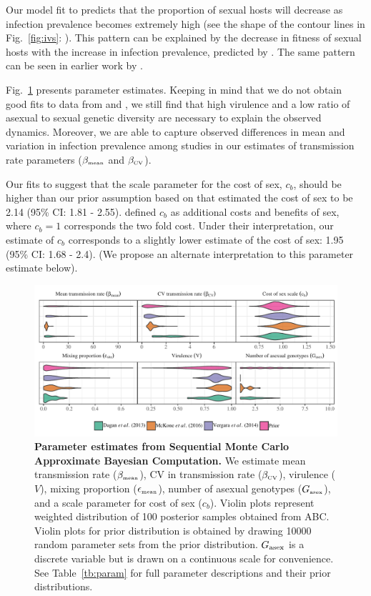 \documentclass{article}\usepackage[]{graphicx}\usepackage[]{color}
\newcommand{\fref}[1]{Fig.~\ref{fig:#1}}
\begin{document}
Our model fit to \cite{vergara2014infection} predicts that the proportion of sexual hosts will decrease as infection prevalence becomes extremely high (see the shape of the contour lines in \fref{ivs}: \cite{vergara2014infection}).
This pattern can be explained by the decrease in fitness of sexual hosts with the increase in infection prevalence, predicted by \cite{ashby2015diversity}.
The same pattern can be seen in earlier work by \cite{lively2010epidemiological}.

\fref{smcparam} presents parameter estimates.
Keeping in mind that we do not obtain good fits to data from \cite{dagan2013clonal} and \cite{mckone2016fine}, we still find that high virulence and a low ratio of asexual to sexual genetic diversity are necessary to explain the observed dynamics.
Moreover, we are able to capture observed differences in mean and variation in infection prevalence among studies in our estimates of transmission rate parameters ($\beta_{\textrm{\tiny mean}}$ and $\beta_{\textrm{\tiny CV}}$).

Our fits to \cite{mckone2016fine} suggest that the scale parameter for the cost of sex, $c_b$, should be higher than our prior assumption based on \cite{gibson2017two} that estimated the cost of sex to be 2.14 (95\% CI: 1.81 - 2.55).
\cite{ashby2015diversity} defined $c_b$ as additional costs and benefits of sex, where $c_b=1$ corresponds the two fold cost.
Under their interpretation, our estimate of $c_b$ corresponds to a slightly lower estimate of the cost of sex: 1.95 (95\% CI: 1.68 - 2.4). 
(We propose an alternate interpretation to this parameter estimate below).

\begin{figure}[!ht]
\includegraphics[width=\textwidth]{../fig/posterior.pdf}
\caption{{\bf Parameter estimates from Sequential Monte Carlo Approximate Bayesian Computation.}
We estimate mean transmission rate ($\beta_{\textrm{\tiny mean}}$), CV in transmission rate ($\beta_{\textrm{\tiny CV}}$), virulence ($V$), mixing proportion ($\epsilon_{\textrm{\tiny mean}}$), number of asexual genotypes ($G_{\textrm{\tiny asex}}$), and a scale parameter for cost of sex ($c_b$).
Violin plots represent weighted distribution of 100 posterior samples obtained from ABC.
Violin plots for prior distribution is obtained by drawing 10000 random parameter sets from the prior distribution.
$G_{\tiny \textrm{asex}}$ is a discrete variable but is drawn on a continuous scale for convenience.
See Table~\ref{tb:param} for full parameter descriptions and their prior distributions.
}
\label{fig:smcparam}
\end{figure}
\end{document}
